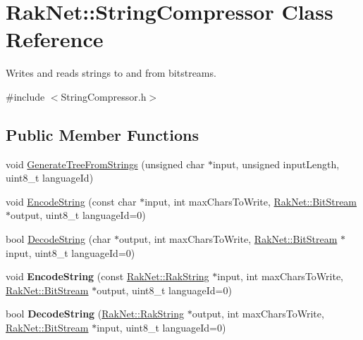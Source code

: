 \hypertarget{class_rak_net_1_1_string_compressor}{\section{Rak\-Net\-:\-:String\-Compressor Class Reference}
\label{class_rak_net_1_1_string_compressor}
}


Writes and reads strings to and from bitstreams.  




{\ttfamily \#include $<$String\-Compressor.\-h$>$}

\subsection*{Public Member Functions}
\begin{DoxyCompactItemize}
\item 
void \hyperlink{class_rak_net_1_1_string_compressor_a85021d4797ca78ed05370edf8489a97a}{Generate\-Tree\-From\-Strings} (unsigned char $\ast$input, unsigned input\-Length, uint8\-\_\-t language\-Id)
\item 
void \hyperlink{class_rak_net_1_1_string_compressor_a334eab1d6548d0212106d3d1108fb842}{Encode\-String} (const char $\ast$input, int max\-Chars\-To\-Write, \hyperlink{class_rak_net_1_1_bit_stream}{Rak\-Net\-::\-Bit\-Stream} $\ast$output, uint8\-\_\-t language\-Id=0)
\item 
bool \hyperlink{class_rak_net_1_1_string_compressor_aa5ee49280353bab84f6bf9154776bec2}{Decode\-String} (char $\ast$output, int max\-Chars\-To\-Write, \hyperlink{class_rak_net_1_1_bit_stream}{Rak\-Net\-::\-Bit\-Stream} $\ast$input, uint8\-\_\-t language\-Id=0)
\item 
\hypertarget{class_rak_net_1_1_string_compressor_a3f550eb7c6ad7c2070498c8fa76699c9}{void {\bfseries Encode\-String} (const \hyperlink{class_rak_net_1_1_rak_string}{Rak\-Net\-::\-Rak\-String} $\ast$input, int max\-Chars\-To\-Write, \hyperlink{class_rak_net_1_1_bit_stream}{Rak\-Net\-::\-Bit\-Stream} $\ast$output, uint8\-\_\-t language\-Id=0)}\label{class_rak_net_1_1_string_compressor_a3f550eb7c6ad7c2070498c8fa76699c9}

\item 
\hypertarget{class_rak_net_1_1_string_compressor_a45d347d9a8e627499739d5044c7b013f}{bool {\bfseries Decode\-String} (\hyperlink{class_rak_net_1_1_rak_string}{Rak\-Net\-::\-Rak\-String} $\ast$output, int max\-Chars\-To\-Write, \hyperlink{class_rak_net_1_1_bit_stream}{Rak\-Net\-::\-Bit\-Stream} $\ast$input, uint8\-\_\-t language\-Id=0)}\label{class_rak_net_1_1_string_compressor_a45d347d9a8e627499739d5044c7b013f}

\end{DoxyCompactItemize}
